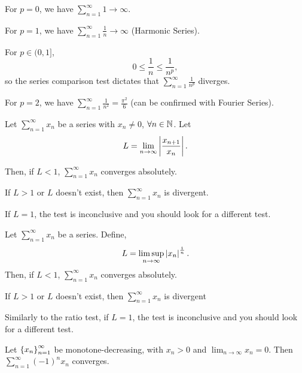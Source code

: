 \documentclass[12pt]{article}
\theoremstyle{definition}
\newcommand{\xn}{\set{x_{n}}_{n = 1}^{\infty}}
\newcommand{\xseries}{\sum_{n = 1}^{\infty}x_{n}}
\newcommand{\nlim}{\lim_{n\rightarrow\infty}}
\begin{document}
            \begin{eg}
                For $p = 0$, we have $\sum_{n = 1}^{\infty}1 \rightarrow \infty$.

                For $p = 1$, we have $\sum_{n = 1}^{\infty}\frac{1}{n} \rightarrow \infty$ (Harmonic Series).

                For $p \in (0, 1]$, 
                \begin{equation*}
                    0 \leq \frac{1}{n} \leq \frac{1}{n^{p}},
                \end{equation*}
                so the series comparison test dictates that $\sum_{n = 1}^{\infty}\frac{1}{n^{p}}$ diverges.

                For $p = 2$, we have $\sum_{n = 1}^{\infty}\frac{1}{n^{2}} = \frac{\pi^{2}}{6}$ (can be confirmed with Fourier Series). 
            \end{eg}

            \begin{prop}
                Let $\xseries$ be a series with $x_{n} \neq 0$, $\forall n \in \mathbb{N}$. Let
                \begin{equation*}
                    L = \lim_{n \rightarrow \infty}\left|\frac{x_{n + 1}}{x_{n}}\right|.
                \end{equation*}

                Then, if $L < 1$, $\xseries$ converges absolutely. 

                If $L > 1$ or $L$ doesn't exist, then $\xseries$ is divergent.
            \end{prop}
            \begin{remark}
                If $L = 1$, the test is inconclusive and you should look for a different test.
            \end{remark}
            \begin{prop}
                Let $\xseries$ be a series. Define,
                \begin{equation*}
                    L = \limsup_{n \rightarrow \infty}\left|x_{n}\right|^{\frac{1}{n}}.
                \end{equation*}
                Then, if $L < 1$, $\xseries$ converges absolutely.

                If $L > 1$ or $L$ doesn't exist, then $\xseries$ is divergent
            \end{prop}
            \begin{remark}
                Similarly to the ratio test, if $L = 1$, the test is inconclusive and you should look for a different test.
            \end{remark}
            \begin{prop}
                Let $\xn$ be monotone-decreasing, with $x_{n} > 0$ and $\nlim x_{n} = 0$. 
                Then $\sum_{n = 1}^{\infty}(-1)^{n}x_{n}$ converges.
            \end{prop}
\end{document}
